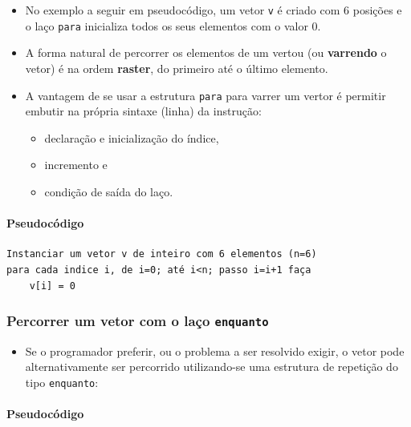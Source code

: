 \documentclass[12pt,a4paper]{article}
\providecommand{\tightlist}{%
      \setlength{\itemsep}{0pt}\setlength{\parskip}{0pt}}
\begin{document}
    \begin{itemize}
\tightlist
\item
  No exemplo a seguir em pseudocódigo, um vetor \texttt{v} é criado com
  6 posições e o laço \texttt{para} inicializa todos os seus elementos
  com o valor 0.
\item
  A forma natural de percorrer os elementos de um vertou (ou
  \textbf{varrendo} o vetor) é na ordem \textbf{raster}, do primeiro até
  o último elemento.
\item
  A vantagem de se usar a estrutura \texttt{para} para varrer um vertor
  é permitir embutir na própria sintaxe (linha) da instrução:

  \begin{itemize}
  \tightlist
  \item
    declaração e inicialização do índice,
  \item
    incremento e
  \item
    condição de saída do laço.
  \end{itemize}
\end{itemize}

    \hypertarget{pseudocuxf3digo}{%
\paragraph{Pseudocódigo}\label{pseudocuxf3digo}}

    \begin{verbatim}
Instanciar um vetor v de inteiro com 6 elementos (n=6)
para cada indice i, de i=0; até i<n; passo i=i+1 faça
    v[i] = 0
\end{verbatim}

    \hypertarget{percorrer-um-vetor-com-o-lauxe7o-enquanto}{%
\subsubsection{\texorpdfstring{Percorrer um vetor com o laço
\texttt{enquanto}}{Percorrer um vetor com o laço enquanto}}\label{percorrer-um-vetor-com-o-lauxe7o-enquanto}}

    \begin{itemize}
\tightlist
\item
  Se o programador preferir, ou o problema a ser resolvido exigir, o
  vetor pode alternativamente ser percorrido utilizando-se uma estrutura
  de repetição do tipo \texttt{enquanto}:
\end{itemize}

    \hypertarget{pseudocuxf3digo}{%
\paragraph{Pseudocódigo}\label{pseudocuxf3digo}}
\end{document}

